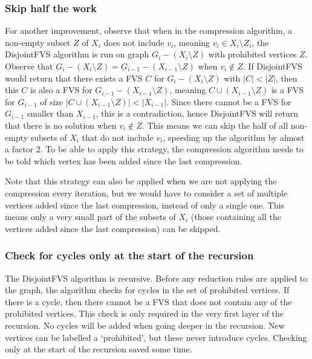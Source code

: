 \subsubsection{Skip half the work}
For another improvement, observe that when in the compression algorithm, a non-empty
subset $Z$ of $X_i$ does not include $v_i$, meaning $v_i \in X_i\setminus Z_i$, the {\sc DisjointFVS} algorithm is run
on graph $G_i-(X_i\setminus Z)$ with prohibited vertices $Z$. Observe that $G_i-(X_i\setminus Z) =
G_{i-1}-(X_{i-1}\setminus Z)$ when $v_i \not\in Z$. If {\sc DisjointFVS} would return that there exists a FVS $C$ for
$G_i-(X_i\setminus Z)$ with $|C|<|Z|$, then this $C$ is also a FVS for $G_{i-1}-(X_{i-1}\setminus Z)$, meaning $C \cup
(X_{i-1}\setminus Z)$ is a FVS for $G_{i-1}$ of size $|C \cup (X_{i-1}\setminus Z)| < |X_{i-1}|$. Since there cannot be
a FVS for $G_{i-1}$ smaller than $X_{i-1}$, this is a contradiction, hence {\sc DisjointFVS} will return that there is
no solution when $v_i \not\in Z$. This means we can skip the half of all non-empty subsets of $X_i$ that do not include
$v_i$, speeding up the algorithm by almost a factor $2$. To be able to apply this strategy, the compression algorithm
needs to be told which vertex has been added since the last compression.

Note that this strategy can also be applied when we are not applying the compression every iteration, but we would have
to consider a set of multiple vertices added since the last compression, instead of only a single one. This means only a
very small part of the subsets of $X_i$ (those containing all the vertices added since the last compression) can be
skipped.

\subsubsection{Check for cycles only at the start of the recursion}
The {\sc DisjointFVS} algorithm is recursive. Before
any reduction rules are applied to the graph, the algorithm checks for cycles in the set of prohibited vertices. If
there is a cycle, then there cannot be a FVS that does not contain any of the prohibited vertices. This check is only
required in the very first layer of the recursion. No cycles will be added when going deeper in the recursion. New
vertices can be labelled a `prohibited', but these never introduce cycles. Checking only at the start of the recursion
saved some time.

